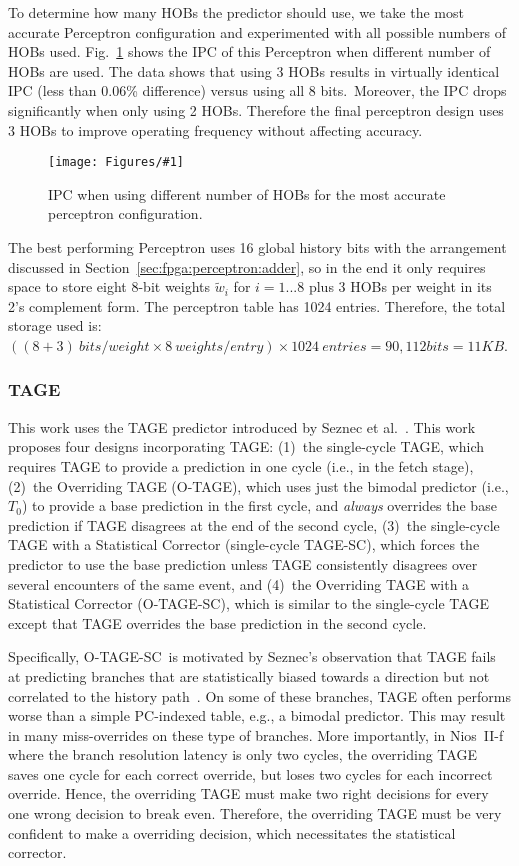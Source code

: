 \documentclass[conference]{IEEEtran}
\newcommand{\kfig}[4]{ %
        \begin{figure}[!t]
        \centering
        \texttt{[image: Figures/\#1]}
        \vspace{-1mm}
        \caption{#3}
        \label{#2}
        \end{figure}
}
\begin{document}
To determine how many HOBs the predictor should use, we take the most accurate Perceptron configuration and experimented with all possible numbers of HOBs used. Fig.~\ref{fig:perceptronHOB} shows the IPC of this Perceptron when different number of HOBs are used. The data shows that using 3 HOBs results in virtually identical IPC (less than 0.06\% difference) versus using all 8 bits.\ Moreover, the IPC drops significantly when only using 2 HOBs. Therefore the final perceptron design uses 3 HOBs to improve operating frequency without affecting accuracy.
\kfig{perceptronHOB.pdf}{fig:perceptronHOB}{IPC when using different number of HOBs for the most accurate perceptron configuration.}{angle = 0, trim = 1in 2.5in 0.9in 2.5in, clip, width=0.4\textwidth}

The best performing Perceptron uses 16 global history bits with the arrangement discussed in Section~\ref{sec:fpga:perceptron:adder}, so in the end it only requires space to store eight 8-bit weights $\widetilde{w}_{i}$ for $i = 1...8$ plus 3 HOBs per weight in its 2's complement form. The perceptron table has 1024 entries. Therefore, the total storage used is: $ ((8+ 3)\ bits/weight \times 8\ weights/entry)\times 1024\ entries  = 90,112 bits = 11KB$. 

\subsubsection{TAGE}
\label{sec:eval:ipc:tage}
This work uses the TAGE predictor introduced by Seznec et al.~\cite{tage}.  This work proposes four designs incorporating TAGE:  (1)~the single-cycle TAGE, which requires TAGE to provide a prediction in one cycle (i.e., in the fetch stage), (2)~the Overriding TAGE (\mbox{O-TAGE}), which uses just the bimodal predictor (i.e., $T_0$) to provide a base prediction in the first cycle, and \textit{always} overrides the base prediction if TAGE disagrees at the end of the second cycle, (3)~the single-cycle TAGE with a Statistical Corrector (single-cycle \mbox{TAGE-SC}), which forces the predictor to use the base prediction unless TAGE consistently disagrees over several encounters of the same event, and (4)~the Overriding TAGE with a Statistical Corrector (\mbox{O-TAGE-SC}), which is similar to the single-cycle TAGE except that TAGE overrides the base prediction in the second cycle.

Specifically,  \mbox{O-TAGE-SC}\ is motivated by Seznec's observation that TAGE fails at predicting branches that are statistically biased towards a direction but not correlated to the history path~\cite{isltage}. On some of these branches, TAGE often performs worse than a simple PC-indexed table, e.g., a bimodal predictor. This may result in many miss-overrides on these type of branches. More importantly, in Nios~II-f where the branch resolution latency is only two cycles, the overriding TAGE saves one cycle for each correct override, but loses two cycles for each incorrect override. Hence, the overriding TAGE must make two right decisions for every one wrong decision to break even. Therefore, the overriding TAGE must be very confident to make a overriding decision, which necessitates the statistical corrector.
\end{document}
